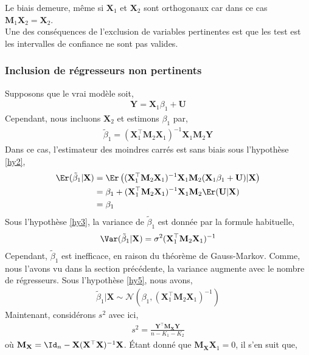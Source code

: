 Le biais demeure, même si $\mathbf{X}_1$ et $\mathbf{X}_2$ sont orthogonaux car dans ce cas $\mathbf{M}_1\mathbf{X}_2 = \mathbf{X}_2$. \\
Une des conséquences de l'exclusion de variables pertinentes est que les test est les intervalles de confiance ne sont pas valides.

\subsubsection*{Inclusion de régresseurs non pertinents}
Supposons que le vrai modèle soit,
\begin{align*}
\mathbf{Y} = \mathbf{X}_1\beta_1 + \mathbf{U}
\end{align*}
Cependant, nous incluons $\mathbf{X}_2$ et estimons $\beta_1$ par,
\begin{align*}
\tilde{\beta}_1 = (\mathbf{X}_1^\top\mathbf{M}_2\mathbf{X}_1)^{-1}\mathbf{X}_1\mathbf{M}_2\mathbf{Y}
\end{align*}
Dans ce cas, l'estimateur des moindres carrés est sans biais sous l'hypothèse \ref{hy2},
\begin{align*}
\Er(\tilde{\beta}_1|\mathbf{X}) &=\Er\left((\mathbf{X}_1^\top\mathbf{M}_2\mathbf{X}_1)^{-1}\mathbf{X}_1\mathbf{M}_2(\mathbf{X}_1\beta_1
+\mathbf{U})|\mathbf{X}\right)\\
&=\beta_1 + (\mathbf{X}_1^\top\mathbf{M}_2\mathbf{X}_1)^{-1}\mathbf{X}_1\mathbf{M}_2\Er(\mathbf{U}|\mathbf{X})\\
&=\beta_1
\end{align*}
Sous l'hypothèse \ref{hy3}, la variance de $\tilde{\beta}_1$ est donnée par la formule habituelle,
\begin{align*}
\Var(\tilde{\beta}_1|\mathbf{X}) = \sigma^2(\mathbf{X}_1^\top\mathbf{M}_2\mathbf{X}_1)^{-1}
\end{align*}
Cependant, $\tilde{\beta}_1$ est inefficace, en raison du théorème de Gauss-Markov. Comme, nous l'avons vu dans la section précédente, la variance augmente avec le nombre de régresseurs. Sous l'hypothèse \ref{hy5}, nous avons,
\begin{align*}
\tilde{\beta}_1|\mathbf{X} \sim\mathcal{N}\left(\beta_1, (\mathbf{X}_1^\top\mathbf{M}_2\mathbf{X}_1)^{-1}\right)
\end{align*} 
Maintenant, considérons $s^2$ avec ici,
\begin{align*}
s^2 = \frac{\mathbf{Y}^\top\mathbf{M}_\mathbf{X}\mathbf{Y}}{n-K_1-K_2}
\end{align*}
où $\mathbf{M}_\mathbf{X} = \Id_n - \mathbf{X}(\mathbf{X}^\top\mathbf{X})^{-1}\mathbf{X}$. \'Etant donné que $\mathbf{M}_\mathbf{X}\mathbf{X}_1=0$, il s'en suit que,
